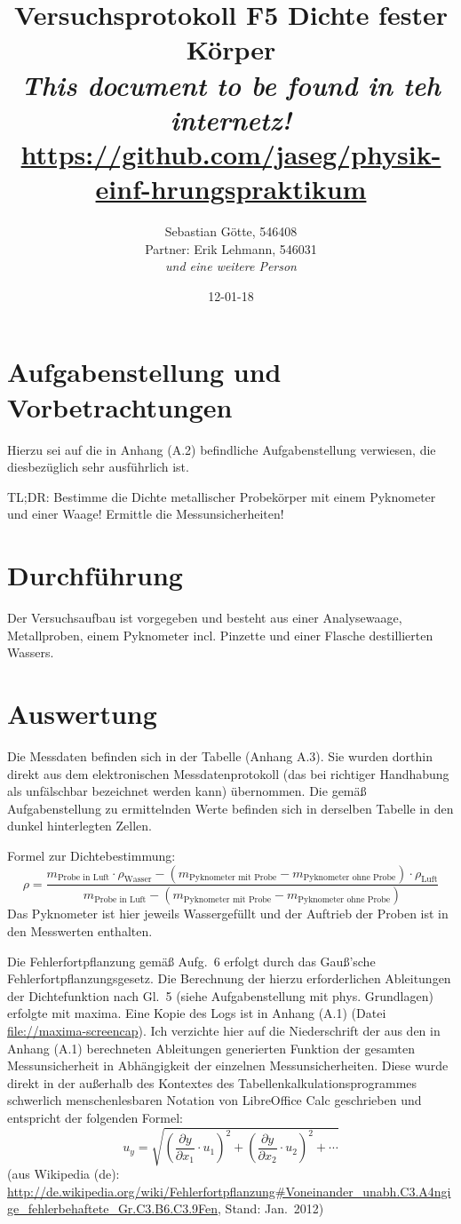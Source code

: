 \documentclass[12pt,a4paper,notitlepage]{article}
\title{Versuchsprotokoll F5 Dichte fester Körper\\
\small\emph{This document to be found in teh internetz!}\\
\url{https://github.com/jaseg/physik-einf-hrungspraktikum}}
\author{Sebastian Götte, 546408\\
Partner: Erik Lehmann, 546031\\
\emph{und eine weitere Person}}
\date{12-01-18}
\begin{document}
\maketitle
\section{Aufgabenstellung und Vorbetrachtungen}
Hierzu sei auf die in Anhang (A.2) befindliche Aufgabenstellung verwiesen, die diesbezüglich sehr ausführlich ist.

TL;DR: Bestimme die Dichte metallischer Probekörper mit einem Pyknometer und einer Waage! Ermittle die Messunsicherheiten!
\section{Durchführung}
Der Versuchsaufbau ist vorgegeben und besteht aus einer Analysewaage, Metallproben, einem Pyknometer incl. Pinzette und einer Flasche destillierten Wassers.
\section{Auswertung}
Die Messdaten befinden sich in der Tabelle (Anhang A.3). Sie wurden dorthin direkt aus dem elektronischen Messdatenprotokoll (das bei richtiger Handhabung als unfälschbar bezeichnet werden kann) übernommen. Die gemäß Aufgabenstellung zu ermittelnden Werte befinden sich in derselben Tabelle in den dunkel hinterlegten Zellen.

Formel zur Dichtebestimmung:
\begin{equation}
\rho = \frac{m_\text{Probe in Luft}\cdot\rho_\text{Wasser}-\left(m_\text{Pyknometer mit Probe}-m_\text{Pyknometer ohne Probe}\right)\cdot\rho_\text{Luft}}{m_\text{Probe in Luft}-\left(m_\text{Pyknometer mit Probe}-m_\text{Pyknometer ohne Probe}\right)}
\end{equation}
Das Pyknometer ist hier jeweils Wassergefüllt und der Auftrieb der Proben ist in den Messwerten enthalten.

Die Fehlerfortpflanzung gemäß Aufg.\ 6 erfolgt durch das Gauß'sche Fehlerfortpflanzungsgesetz. Die Berechnung der hierzu erforderlichen Ableitungen der Dichtefunktion nach Gl.\ 5 (siehe Aufgabenstellung mit phys. Grundlagen) erfolgte mit maxima. Eine Kopie des Logs ist in Anhang (A.1) (Datei \url{file://maxima-screencap}).
Ich verzichte hier auf die Niederschrift der aus den in Anhang (A.1) berechneten Ableitungen generierten Funktion der gesamten Messunsicherheit in Abhängigkeit der einzelnen Messunsicherheiten. Diese wurde direkt in der außerhalb des Kontextes des Tabellenkalkulationsprogrammes schwerlich menschenlesbaren Notation von LibreOffice Calc geschrieben und entspricht der folgenden Formel:
\begin{equation}
{u_y}=\sqrt {\left (\frac{\partial y}{\partial x_1} \cdot u_1 \right)^2 +\left (\frac{\partial y}{\partial x_2} \cdot u_2 \right)^2 +\cdots }
\end{equation}
(aus Wikipedia (de): \url{http://de.wikipedia.org/wiki/Fehlerfortpflanzung#Voneinander_unabh.C3.A4ngige_fehlerbehaftete_Gr.C3.B6.C3.9Fen}, Stand: Jan.\ 2012)
\end{document}
